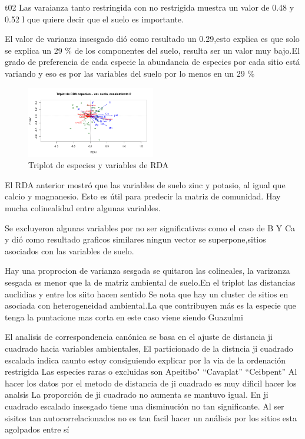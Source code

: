 \documentclass[11pt,]{article}
\begin{document}
t02 Las varaianza tanto restringida con no restrigida muestra un valor
de 0.48 y 0.52 l que quiere decir que el suelo es importante.

El valor de varianza insesgado dió como resultado un 0.29,esto explica
es que solo se explica un 29 \% de los componentes del suelo, resulta
ser un valor muy bajo.El grado de preferencia de cada especie la
abundancia de especies por cada sitio está variando y eso es por las
variables del suelo por lo menos en un 29 \%

\begin{figure}
\centering
\includegraphics[width=0.50000\textwidth]{triplot_especies_variables.png}
\caption{Triplot de especies y variables de RDA}
\end{figure}

El RDA anterior mostró que las variables de suelo zinc y potasio, al
igual que calcio y magnanesio. Esto es útil para predecir la matriz de
comunidad. Hay mucha colinealidad entre algunas variables.

Se excluyeron algunas variables por no ser significativas como el caso
de B Y Ca y dió como resultado graficos similares ningun vector se
superpone,sitios asociados con las variables de suelo.

Hay una proprocion de varianza sesgada se quitaron las colineales, la
varizanza sesgada es menor que la de matriz ambiental de suelo.En el
triplot las distancias auclidias y entre los siito hacen sentido Se nota
que hay un cluster de sitios en asociada con heterogeneidad ambiental.La
que contribuyen más es la especie que tenga la puntacione mas corta en
este caso viene siendo Guazulmi

El analisis de correspondencia canónica se basa en el ajuste de
distancia ji cuadrado hacia variables ambientales, El particionado de la
distncia ji cuadrado escalada indica caunto estoy consiguiendo explicar
por la via de la ordenación restrigida Las especies raras o excluidas
son Apeitibo" ``Cavaplat'' ``Ceibpent'' Al hacer los datos por el metodo
de distancia de ji cuadrado es muy dificil hacer los analsis La
proporción de ji cuadrado no aumenta se mantuvo igual. En ji cuadrado
escalado insesgado tiene una disminución no tan significante. Al ser
sisitos tan autocorrelacionados no es tan facil hacer un análisis por
los sitios esta agolpados entre sí
\end{document}
